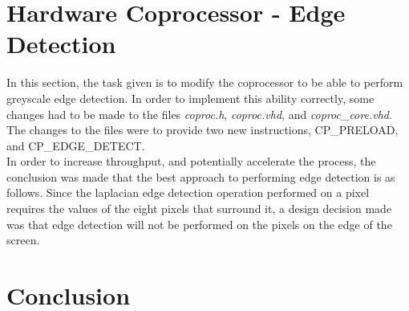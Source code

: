 \documentclass{article}
\begin{document}
\section{Hardware Coprocessor - Edge Detection}
In this section, the task given is to modify the coprocessor to be able to perform greyscale edge detection. In order to implement this ability correctly, some changes had to be made to the files \textit{coproc.h}, \textit{coproc.vhd}, and \textit{coproc\_core.vhd}. The changes to the files were to provide two new instructions, CP\_PRELOAD, and CP\_EDGE\_DETECT.\\
In order to increase throughput, and potentially accelerate the process, the conclusion was made that the best approach to performing edge detection is as follows. Since the laplacian edge detection operation performed on a pixel requires the values of the eight pixels that surround it, a design decision made was that edge detection will not be performed on the pixels on the edge of the screen. 

\section{Conclusion}




%

%

\end{document}
